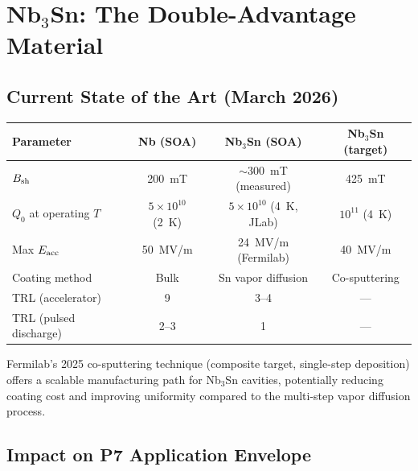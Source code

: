 \documentclass[11pt]{article}
\newcommand{\ee}[1]{\times 10^{#1}}
\begin{document}
\section{Nb$_3$Sn: The Double-Advantage Material}
\label{sec:Nb3Sn}

\subsection{Current State of the Art (March 2026)}

\begin{center}
\begin{tabular}{lccc}
\toprule
Parameter & Nb (SOA) & Nb$_3$Sn (SOA) & Nb$_3$Sn (target) \\
\midrule
$B_{\rm sh}$ & 200~mT & $\sim$300~mT (measured) & 425~mT \\
$Q_0$ at operating $T$ & $5\ee{10}$ (2~K) & $5\ee{10}$ (4~K, JLab)
  & $10^{11}$ (4~K) \\
Max $E_{\rm acc}$ & 50~MV/m & 24~MV/m (Fermilab) & 40~MV/m \\
Coating method & Bulk & Sn vapor diffusion & Co-sputtering \\
TRL (accelerator) & 9 & 3--4 & --- \\
TRL (pulsed discharge) & 2--3 & 1 & --- \\
\bottomrule
\end{tabular}
\end{center}

Fermilab's 2025 co-sputtering technique (composite target, single-step
deposition) offers a scalable manufacturing path for Nb$_3$Sn cavities,
potentially reducing coating cost and improving uniformity compared
to the multi-step vapor diffusion process.

\subsection{Impact on P7 Application Envelope}
\end{document}
